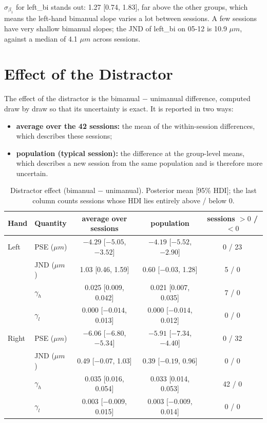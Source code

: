 \documentclass[11pt]{article}
\begin{document}
$\sigma_{\beta_1}$ for left\_bi stands out: 1.27 [0.74, 1.83], far above the
other groups, which means the left-hand bimanual slope varies a lot between
sessions. A few sessions have very shallow bimanual slopes; the JND of left\_bi
on 05-12 is 10.9 $\mu m$, against a median of 4.1 $\mu m$ across sessions.

\section{Effect of the Distractor}
\label{sec:effect}

The effect of the distractor is the bimanual $-$ unimanual difference,
computed draw by draw so that its uncertainty is exact. It is reported in two
ways:
\begin{itemize}
  \item \textbf{average over the 42 sessions:} the mean of the within-session
        differences, which describes these sessions;
  \item \textbf{population (typical session):} the difference at the group-level
        means, which describes a new session from the same population and is
        therefore more uncertain.
\end{itemize}

\begin{table}[H]
\centering
\caption{Distractor effect (bimanual $-$ unimanual). Posterior mean [95\% HDI];
the last column counts sessions whose HDI lies entirely above / below 0.}
\label{tab:effect}
\small
\begin{tabular}{llccc}
\toprule
Hand & Quantity & average over sessions & population & sessions $>0$ / $<0$ \\
\midrule
Left  & PSE ($\mu m$) & $-4.29$ [$-5.05$, $-3.52$] & $-4.19$ [$-5.52$, $-2.90$] & 0 / 23 \\
      & JND ($\mu m$) & 1.03 [0.46, 1.59] & 0.60 [$-0.03$, 1.28] & 5 / 0 \\
      & $\gamma_h$    & 0.025 [0.009, 0.042] & 0.021 [0.007, 0.035] & 7 / 0 \\
      & $\gamma_l$    & 0.000 [$-0.014$, 0.013] & 0.000 [$-0.014$, 0.012] & 0 / 0 \\
\midrule
Right & PSE ($\mu m$) & $-6.06$ [$-6.80$, $-5.34$] & $-5.91$ [$-7.34$, $-4.40$] & 0 / 32 \\
      & JND ($\mu m$) & 0.49 [$-0.07$, 1.03] & 0.39 [$-0.19$, 0.96] & 0 / 0 \\
      & $\gamma_h$    & 0.035 [0.016, 0.054] & 0.033 [0.014, 0.053] & 42 / 0 \\
      & $\gamma_l$    & 0.003 [$-0.009$, 0.015] & 0.003 [$-0.009$, 0.014] & 0 / 0 \\
\bottomrule
\end{tabular}
\end{table}
\end{document}

